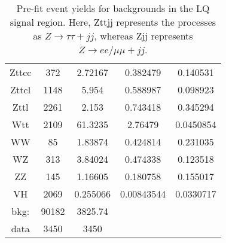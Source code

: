 \begin{table}
\begin{tabular}{|c|c|c|c|c|}
Zttcc      & 372     & 2.72167  & 0.382479 & 0.140531\\
Zttcl      & 1148    & 5.954    & 0.588987 & 0.098923\\
Zttl       & 2261    & 2.153    & 0.743418 & 0.345294\\
Wtt        & 2109    & 61.3235  & 2.76479  & 0.0450854\\
WW         & 85      & 1.83874  & 0.424814 & 0.231035\\
WZ         & 313     & 3.84024  & 0.474338 & 0.123518\\
ZZ         & 145     & 1.16605  & 0.180758 & 0.155017\\
VH         & 2069    & 0.255066 & 0.00843544 & 0.0330717\\
bkg:       & 90182   & 3825.74  & & \\
data       & 3450    & 3450     & & \\
\hline
\hline
\end{tabular}
\caption{Pre-fit event yields for backgrounds in the LQ \hadhad signal region. Here, Zttjj represents the processes as $Z\rightarrow\tau\tau + jj$,
whereas Zjj represents  $Z\rightarrow ee/\mu\mu + jj$.}
\label{tab:LQHadHadYields}
\end{table}

